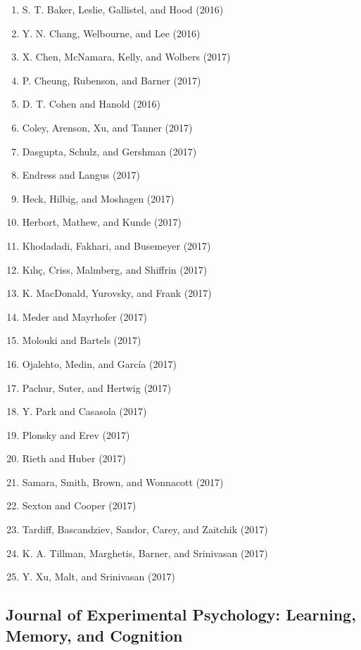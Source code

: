 \documentclass[english,man]{apa6}
\providecommand{\tightlist}{%
  \setlength{\itemsep}{0pt}\setlength{\parskip}{0pt}}
\theoremstyle{definition}
\theoremstyle{definition}
\theoremstyle{definition}
\theoremstyle{remark}
\begin{document}
\begin{enumerate}
\def\labelenumi{\arabic{enumi})}
\tightlist
\item
  S. T. Baker, Leslie, Gallistel, and Hood (2016)
\item
  Y. N. Chang, Welbourne, and Lee (2016)
\item
  X. Chen, McNamara, Kelly, and Wolbers (2017)
\item
  P. Cheung, Rubenson, and Barner (2017)
\item
  D. T. Cohen and Hanold (2016)
\item
  Coley, Arenson, Xu, and Tanner (2017)
\item
  Dasgupta, Schulz, and Gershman (2017)
\item
  Endress and Langus (2017)
\item
  Heck, Hilbig, and Moshagen (2017)
\item
  Herbort, Mathew, and Kunde (2017)
\item
  Khodadadi, Fakhari, and Busemeyer (2017)
\item
  Kılıç, Criss, Malmberg, and Shiffrin (2017)
\item
  K. MacDonald, Yurovsky, and Frank (2017)
\item
  Meder and Mayrhofer (2017)
\item
  Molouki and Bartels (2017)
\item
  Ojalehto, Medin, and García (2017)
\item
  Pachur, Suter, and Hertwig (2017)
\item
  Y. Park and Casasola (2017)
\item
  Plonsky and Erev (2017)
\item
  Rieth and Huber (2017)
\item
  Samara, Smith, Brown, and Wonnacott (2017)
\item
  Sexton and Cooper (2017)
\item
  Tardiff, Bascandziev, Sandor, Carey, and Zaitchik (2017)
\item
  K. A. Tillman, Marghetis, Barner, and Srinivasan (2017)
\item
  Y. Xu, Malt, and Srinivasan (2017)
\end{enumerate}

\subsection{Journal of Experimental Psychology: Learning, Memory, and
Cognition}\label{journal-of-experimental-psychology-learning-memory-and-cognition}
\end{document}

